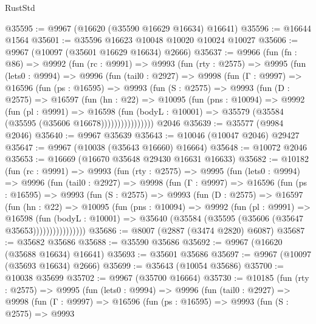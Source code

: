 \begin{lexlean}{RustStd}
\begin{coremodule}
@35595 := @9967 (@16620 (@35590 @16629 @16634) @16641)
@35596 := @16644 @1564
@35601 := @35596 @16623 @10048 @10020 @10024 @10027
@35606 := @9967 (@10097 (@35601 @16629 @16634) @2666)
@35637 := @9966
    (fun (fn : @86) =>
    @9992
      (fun (rc : @9991) =>
      @9993
        (fun (rty : @2575) =>
        @9995
          (fun (lets0 : @9994) =>
          @9996
            (fun (tail0 : @2927) =>
            @9998
              (fun (Γ : @9997) =>
              @16596
                (fun (ps : @16595) =>
                @9993
                  (fun (S : @2575) =>
                  @9993
                    (fun (D : @2575) =>
                    @16597
                      (fun (hn : @22) =>
                      @10095
                        (fun (pns : @10094) =>
                        @9992
                          (fun (pl : @9991) =>
                          @16598
                            (fun (bodyL : @10001) =>
                            @35579 (@35584 (@35595 (@35606 @16678))))))))))))))))
    @2046
@35639 := @35577 (@9984 @2046)
@35640 := @9967 @35639
@35643 := @10046 (@10047 @2046) @29427
@35647 := @9967 (@10038 (@35643 @16660) @16664)
@35648 := @10072 @2046
@35653 := @16669 (@16670 @35648 @29430 @16631 @16633)
@35682 := @10182
    (fun (rc : @9991) =>
    @9993
      (fun (rty : @2575) =>
      @9995
        (fun (lets0 : @9994) =>
        @9996
          (fun (tail0 : @2927) =>
          @9998
            (fun (Γ : @9997) =>
            @16596
              (fun (ps : @16595) =>
              @9993
                (fun (S : @2575) =>
                @9993
                  (fun (D : @2575) =>
                  @16597
                    (fun (hn : @22) =>
                    @10095
                      (fun (pns : @10094) =>
                      @9992
                        (fun (pl : @9991) =>
                        @16598
                          (fun (bodyL : @10001) =>
                          @35640 (@35584 (@35595 (@35606 (@35647 @35653))))))))))))))))
@35686 := @8007 (@2887 (@3474 @2820) @6087)
@35687 := @35682 @35686
@35688 := @35590 @35686
@35692 := @9967 (@16620 (@35688 @16634) @16641)
@35693 := @35601 @35686
@35697 := @9967 (@10097 (@35693 @16634) @2666)
@35699 := @35643 (@10054 @35686)
@35700 := @10038 @35699
@35702 := @9967 (@35700 @16664)
@35730 := @10185
    (fun (rty : @2575) =>
    @9995
      (fun (lets0 : @9994) =>
      @9996
        (fun (tail0 : @2927) =>
        @9998
          (fun (Γ : @9997) =>
          @16596
            (fun (ps : @16595) =>
            @9993
              (fun (S : @2575) =>
              @9993

\end{coremodule}
\end{lexlean}

